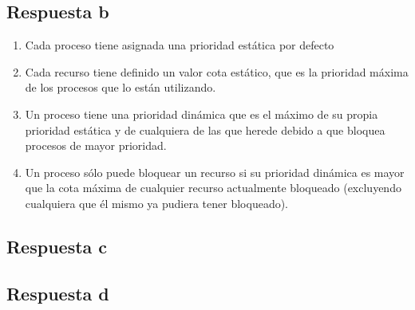 \documentclass[a4paper,10pt]{article}
\begin{document}
\subsection{Respuesta b}

\begin{enumerate}
	\item Cada proceso tiene asignada una prioridad estática por defecto
	\item Cada recurso tiene definido un valor cota estático, que es la
		prioridad máxima de los procesos que lo están utilizando.
	\item Un proceso tiene una prioridad dinámica que es el máximo de su
		propia prioridad estática y de cualquiera de las que herede
		debido a que bloquea procesos de mayor prioridad.
	\item Un proceso sólo puede bloquear un recurso si su prioridad dinámica
		es mayor que la cota máxima de cualquier recurso actualmente
		bloqueado (excluyendo cualquiera que él mismo ya pudiera tener
		bloqueado).
\end{enumerate}

\subsection{Respuesta c}

\subsection{Respuesta d}
\end{document}
